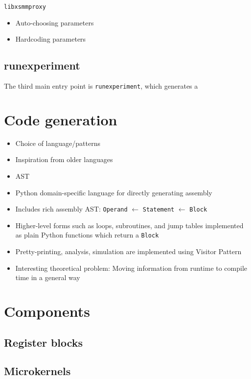 \texttt{libxsmmproxy} 

\begin{itemize}
	\item Auto-choosing parameters
	\item Hardcoding parameters
\end{itemize}

\subsection{runexperiment}
The third main entry point is \texttt{runexperiment}, which generates a 



\section{Code generation}
\begin{itemize}
	\item Choice of language/patterns
	\item Inspiration from older languages
    \item AST

\end{itemize}

\begin{itemize}
    \item Python domain-specific language for directly generating assembly
    \item Includes rich assembly AST: \texttt{Operand} $\leftarrow$ \texttt{Statement} $\leftarrow$ \texttt{Block} 
    \item Higher-level forms such as loops, subroutines, and jump tables
          implemented as plain Python functions which return a \texttt{Block}
    \item Pretty-printing, analysis, simulation are implemented using Visitor Pattern
    \item Interesting theoretical problem: Moving information from runtime to compile time in a general way
\end{itemize}

\section{Components}
\subsection{Register blocks}
\subsection{Microkernels}

